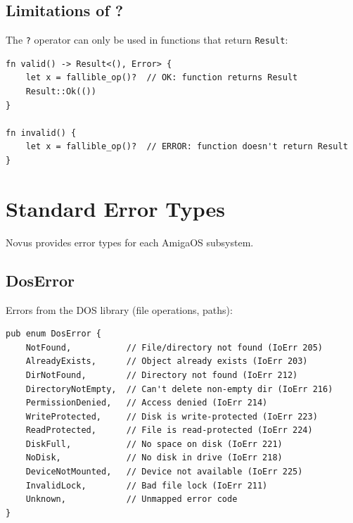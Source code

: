 \subsection{Limitations of ?}

The \texttt{?} operator can only be used in functions that return \texttt{Result}:

\begin{lstlisting}
fn valid() -> Result<(), Error> {
    let x = fallible_op()?  // OK: function returns Result
    Result::Ok(())
}

fn invalid() {
    let x = fallible_op()?  // ERROR: function doesn't return Result
}
\end{lstlisting}

\section{Standard Error Types}
\label{sec:standard-errors}

Novus provides error types for each AmigaOS subsystem.

\subsection{DosError}

Errors from the DOS library (file operations, paths):

\begin{lstlisting}
pub enum DosError {
    NotFound,           // File/directory not found (IoErr 205)
    AlreadyExists,      // Object already exists (IoErr 203)
    DirNotFound,        // Directory not found (IoErr 212)
    DirectoryNotEmpty,  // Can't delete non-empty dir (IoErr 216)
    PermissionDenied,   // Access denied (IoErr 214)
    WriteProtected,     // Disk is write-protected (IoErr 223)
    ReadProtected,      // File is read-protected (IoErr 224)
    DiskFull,           // No space on disk (IoErr 221)
    NoDisk,             // No disk in drive (IoErr 218)
    DeviceNotMounted,   // Device not available (IoErr 225)
    InvalidLock,        // Bad file lock (IoErr 211)
    Unknown,            // Unmapped error code
}
\end{lstlisting}

